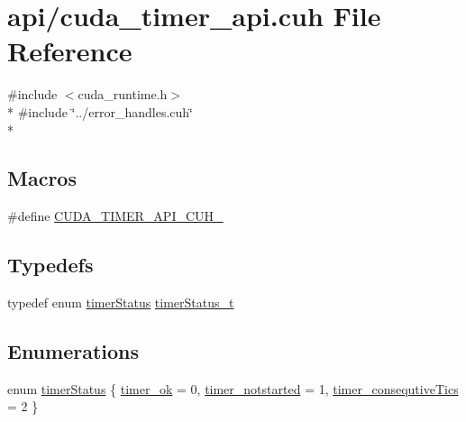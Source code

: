 \hypertarget{cuda__timer__api_8cuh}{}\section{api/cuda\+\_\+timer\+\_\+api.cuh File Reference}
\label{cuda__timer__api_8cuh}
{\ttfamily \#include $<$cuda\+\_\+runtime.\+h$>$}\\*
{\ttfamily \#include \char`\"{}../error\+\_\+handles.\+cuh\char`\"{}}\\*
\subsection*{Macros}
\begin{DoxyCompactItemize}
\item 
\#define \hyperlink{cuda__timer__api_8cuh_ae0cf6aec8edd551cd73bb8a5578a2ba4}{C\+U\+D\+A\+\_\+\+T\+I\+M\+E\+R\+\_\+\+A\+P\+I\+\_\+\+C\+U\+H\+\_\+}
\end{DoxyCompactItemize}
\subsection*{Typedefs}
\begin{DoxyCompactItemize}
\item 
typedef enum \hyperlink{cuda__timer__api_8cuh_a6c659d595b94b16f6ab6881f9bad1e30}{timer\+Status} \hyperlink{cuda__timer__api_8cuh_a27fad73c3da5a06a8d7ae755180ce324}{timer\+Status\+\_\+t}
\end{DoxyCompactItemize}
\subsection*{Enumerations}
\begin{DoxyCompactItemize}
\item 
enum \hyperlink{cuda__timer__api_8cuh_a6c659d595b94b16f6ab6881f9bad1e30}{timer\+Status} \{ \hyperlink{cuda__timer__api_8cuh_a6c659d595b94b16f6ab6881f9bad1e30aefe65d90f79bf4ae7e52c006d78e6726}{timer\+\_\+ok} = 0, 
\hyperlink{cuda__timer__api_8cuh_a6c659d595b94b16f6ab6881f9bad1e30ac8c88841a6d6d20ffcb8c0bd6ab16427}{timer\+\_\+notstarted} = 1, 
\hyperlink{cuda__timer__api_8cuh_a6c659d595b94b16f6ab6881f9bad1e30a183bcb3c4c7435d37ceb05f00fd617f5}{timer\+\_\+consequtive\+Tics} = 2
 \}
\end{DoxyCompactItemize}
